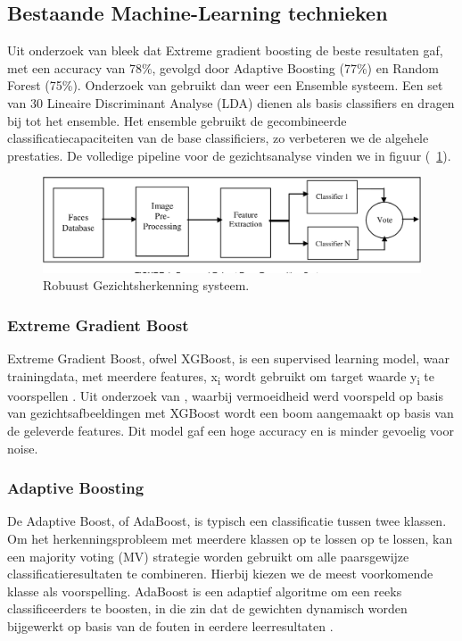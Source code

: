 \subsection{Bestaande Machine-Learning technieken}
Uit onderzoek van \textcite{Sanil2023} bleek dat Extreme gradient boosting de beste resultaten gaf, met een accuracy van 78\%, gevolgd door Adaptive Boosting (77\%) en Random Forest (75\%). Onderzoek van \autocite{Khan2017} gebruikt dan weer een Ensemble systeem. Een set van 30 Lineaire Discriminant Analyse (LDA) dienen als basis classifiers en dragen bij tot het ensemble. Het ensemble gebruikt de gecombineerde classificatiecapaciteiten van de base classificiers, zo verbeteren we de algehele prestaties. De volledige pipeline voor de gezichtsanalyse vinden we in figuur (~\ref{fig:ensemble}). 
\begin{figure}
    \centering
    \includegraphics[width=\columnwidth]{graphics/ensemble.png}
    \caption{\label{fig:ensemble}Robuust Gezichtsherkenning systeem\autocite{Khan2017}.}
\end{figure}

\subsubsection{Extreme Gradient Boost}
\label{subsub:xgboost}
Extreme Gradient Boost, ofwel XGBoost, is een supervised learning model, waar trainingdata, met meerdere features, x\textsubscript{i} wordt gebruikt om target waarde y\textsubscript{i} te voorspellen \autocite{XGBoost2023}. Uit onderzoek van \autocite{Chen2023}, waarbij vermoeidheid werd voorspeld op basis van gezichtsafbeeldingen met XGBoost wordt een boom aangemaakt op basis van de geleverde features. Dit model gaf een hoge accuracy en is minder gevoelig voor noise. 

\subsubsection{Adaptive Boosting}
\label{subsub:adaboost}
De Adaptive Boost, of AdaBoost, is typisch een classificatie tussen twee klassen. Om het herkenningsprobleem met meerdere klassen op te lossen op te lossen, kan een majority voting (MV) strategie worden gebruikt om alle paarsgewijze classificatieresultaten te combineren. Hierbij kiezen we de meest voorkomende klasse als voorspelling. AdaBoost is een adaptief algoritme om een reeks classificeerders te boosten, in die zin dat de gewichten dynamisch worden bijgewerkt op basis van de fouten in eerdere leerresultaten \autocite{Guo2001}.

